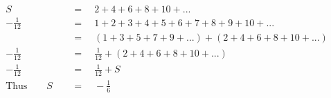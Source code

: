 \begin{align*}
S\quad&\,=\quad2+4+6+8+10+...\\
-\frac{1}{12}\quad&\,=\quad1+2+3+4+5+6+7+8+9+10+...\\
\,&\,=\quad(1+3+5+7+9+...)+(2+4+6+8+10+...)\\
-\frac{1}{12}\quad&\,=\quad\frac{1}{12}+(2+4+6+8+10+...)\\
-\frac{1}{12}\quad&\,=\quad\frac{1}{12}+S\\
\mathrm{Thus}\qquad S\quad&\,=\quad-\frac{1}{6}
\end{align*}
